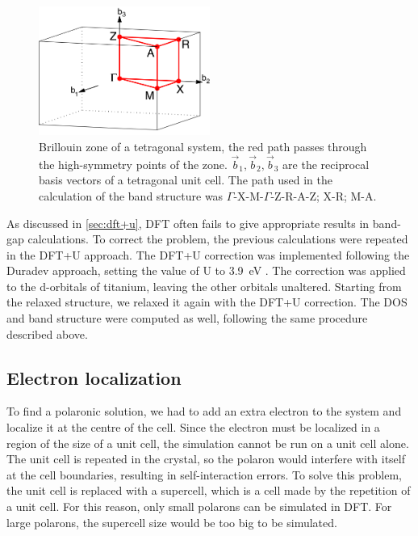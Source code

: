 \begin{figure}
    \centering
    \includegraphics[width=0.5\textwidth]{figures/brillouin_zone}
    \caption[Brillouin zone of a tetragonal system]{Brillouin zone of a tetragonal system, the red path passes through the high-symmetry points of the zone. $\vec{b}_1, \vec{b}_2, \vec{b}_3$ are the reciprocal basis vectors of a tetragonal unit cell. The path used in the calculation of the band structure was $\Gamma$-X-M-$\Gamma$-Z-R-A-Z; X-R; M-A.}
    \label{fig:symmetry_points}
\end{figure}

As discussed in \cref{sec:dft+u}, DFT often fails to give appropriate results in band-gap calculations. To correct the problem, the previous calculations were repeated in the DFT+U approach.  The DFT+U correction was implemented following the Duradev approach, setting the value of U to \SI{3.9}{eV} \cite{reticcioli2022}. The correction was applied to the d-orbitals of titanium, leaving the other orbitals unaltered. Starting from the relaxed structure, we relaxed it again with the DFT+U correction. The DOS and band structure were computed as well, following the same procedure described above.

\subsection{Electron localization}
To find a polaronic solution, we had to add an extra electron to the system and localize it at the centre of the cell. Since the electron must be localized in a region of the size of a unit cell, the simulation cannot be run on a unit cell alone. The unit cell is repeated in the crystal, so the polaron would interfere with itself at the cell boundaries, resulting in self-interaction errors. To solve this problem, the unit cell is replaced with a supercell, which is a cell made by the repetition of a unit cell. For this reason, only small polarons can be simulated in DFT. For large polarons, the supercell size would be too big to be simulated.

